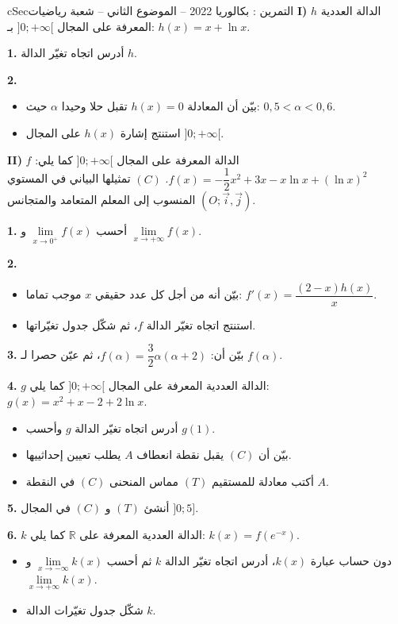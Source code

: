 \documentclass[12pt,a4paper]{article}
\newenvironment{BOX}[2]{\begin{otherlanguage}{english}\begin{arbox}{#1}{#2}}{\end{arbox}\end{otherlanguage}}
\newcounter{exo}
\newenvironment{tamrin}[1]{\stepcounter{exo}\begin{BOX}{cSec}{التمرين \theexo: #1}}{\end{BOX}}
\newcommand{\R}{\mathbb{R}}
\newenvironment{sq}{\begin{itemize}[leftmargin=2.4em,itemsep=3pt]}{\end{itemize}}
\newcommand{\qa}{\item[(أ)]}\newcommand{\qb}{\item[(ب)]}\newcommand{\qc}{\item[(جـ)]}\newcommand{\qd}{\item[(د)]}\newcommand{\qe}{\item[(هـ)]}
\newcommand{\QQ}[1]{\par\smallskip\textbf{#1.} }
\begin{document}
\begin{tamrin}{بكالوريا 2022 -- الموضوع الثاني -- شعبة رياضيات}
\textbf{I)} $h$ الدالة العددية المعرفة على المجال $]0;+\infty[$ بـ: $h(x)=x+\ln x$.
\QQ{1} أدرس اتجاه تغيّر الدالة $h$.
\QQ{2}
\begin{sq}
\qa بيّن أن المعادلة $h(x)=0$ تقبل حلا وحيدا $\alpha$ حيث: $0{,}5<\alpha<0{,}6$.
\qb استنتج إشارة $h(x)$ على المجال $]0;+\infty[$.
\end{sq}

\textbf{II)} $f$ الدالة المعرفة على المجال $]0;+\infty[$ كما يلي: $f(x)=-\dfrac12x^2+3x-x\ln x+(\ln x)^2$.
$(C)$ تمثيلها البياني في المستوي المنسوب إلى المعلم المتعامد والمتجانس $(O;\vec i,\vec j)$.
\QQ{1} أحسب $\lim\limits_{x\to 0^{+}}f(x)$ و $\lim\limits_{x\to +\infty}f(x)$.
\QQ{2}
\begin{sq}
\qa بيّن أنه من أجل كل عدد حقيقي $x$ موجب تماما: $f'(x)=\dfrac{(2-x)h(x)}{x}$.
\qb استنتج اتجاه تغيّر الدالة $f$، ثم شكّل جدول تغيّراتها.
\end{sq}
\QQ{3} بيّن أن: $f(\alpha)=\dfrac32\alpha(\alpha+2)$، ثم عيّن حصرا لـ $f(\alpha)$.
\QQ{4} $g$ الدالة العددية المعرفة على المجال $]0;+\infty[$ كما يلي: $g(x)=x^2+x-2+2\ln x$.
\begin{sq}
\qa أدرس اتجاه تغيّر الدالة $g$ وأحسب $g(1)$.
\qb بيّن أن $(C)$ يقبل نقطة انعطاف $A$ يطلب تعيين إحداثييها.
\qc أكتب معادلة للمستقيم $(T)$ مماس المنحنى $(C)$ في النقطة $A$.
\end{sq}
\QQ{5} أنشئ $(T)$ و $(C)$ في المجال $]0;5]$.
\QQ{6} $k$ الدالة العددية المعرفة على $\R$ كما يلي: $k(x)=f\left(e^{-x}\right)$.
\begin{sq}
\qa دون حساب عبارة $k(x)$، أدرس اتجاه تغيّر الدالة $k$ ثم أحسب $\lim\limits_{x\to -\infty}k(x)$ و $\lim\limits_{x\to +\infty}k(x)$.
\qb شكّل جدول تغيّرات الدالة $k$.
\end{sq}
\end{tamrin}
\end{document}
